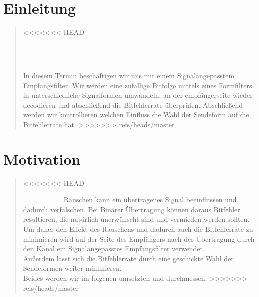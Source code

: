 \section{Einleitung}
\begin{quote}
<<<<<<< HEAD
    
     \\
=======
	
	In diesem Termin beschäftigen wir uns mit einem Signalangepasstem Empfangsfilter. Wir werden eine zufällige Bitfolge
	mittels eines Formfilters in unterschiedliche Signalformen umwandeln, an der empfängerseite wieder decodieren und
	abschließend die Bitfehlerrate überprüfen. Abschließend werden wir kontrollieren welchen Einfluss die Wahl der
	Sendeform auf die Bitfehlerrate hat.
>>>>>>> refs/heads/master


\end{quote}%

\section{Motivation}
\begin{quote}
<<<<<<< HEAD
    
    
    
=======
	Rauschen kann ein übertragenes Signal beeinflussen und dadurch verfälschen. Bei Binärer Übertragung können daraus
	Bitfehler resultieren, die natürlich unerwünscht sind und vermieden werden sollten. Um daher den Effekt des Rauschens
	und dadurch auch die Bitfehlerrate zu minimieren wird auf der Seite des Empfängers nach der Übertragung
	durch den Kanal ein Signalangepasstes Empfangsfilter verwendet.\\
	Außerdem lässt sich die Bitfehlerrate durch eine geschickte Wahl der Sendeformen weiter minimieren.\\
	Beides werden wir im folgenen umsetzten und durchmessen. 
>>>>>>> refs/heads/master
\end{quote} %



